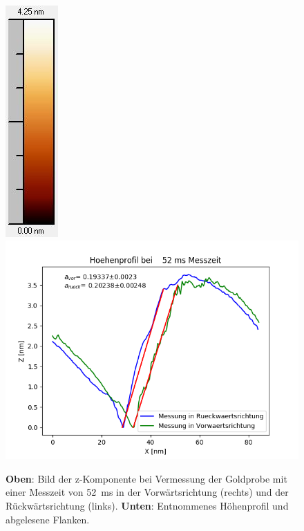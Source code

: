 \documentclass[12pt,a4paper]{article}
\begin{document}
\begin{figure}
\includegraphics[scale=0.6]{Bilder/Anhang/Zeit/0_052_Zeit_nach_Skala.jpg}
\includegraphics[scale=0.6]{Bilder/Anhang/Zeit/Profil_Zeit_52.png}
\caption{\textbf{Oben}: Bild der z-Komponente bei Vermessung der Goldprobe mit einer Messzeit von \SI{52}{ms} in der Vorwärtsrichtung (rechts) und der Rückwärtsrichtung (links). \textbf{Unten}: Entnommenes Höhenprofil und abgelesene Flanken.}
\end{figure}
\end{document}
